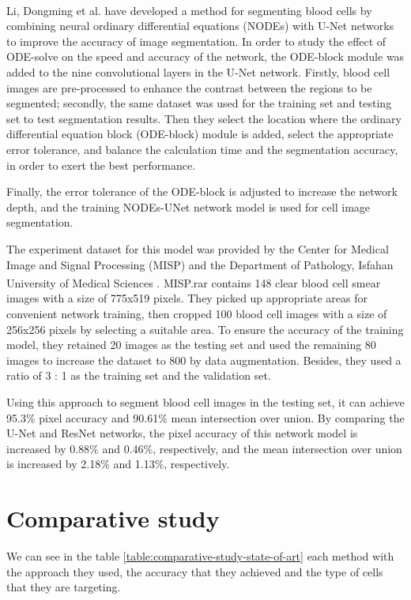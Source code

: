 {Li, Dongming et al. \textsuperscript{\cite{li2021robust}} have developed a method for segmenting blood cells by combining neural ordinary differential equations (NODEs) with U-Net networks to improve the accuracy of image segmentation. In order to study the effect of ODE-solve on the speed and accuracy of the network, the ODE-block module was added to the nine convolutional layers in the U-Net network. Firstly, blood cell images are pre-processed to enhance the contrast between the regions to be segmented; secondly, the same dataset was used for the training set and testing set to test segmentation results. Then they select the location where the ordinary differential equation block (ODE-block) module is added, select the appropriate error tolerance, and balance the calculation time and the segmentation accuracy, in order to exert the best performance.\

Finally, the error tolerance of the ODE-block is adjusted to increase the network depth, and the training NODEs-UNet network model is used for cell image segmentation. 

The experiment dataset for this model was provided by the Center for Medical Image and Signal Processing (MISP) and the Department of Pathology, Isfahan University of Medical Sciences \textsuperscript{\cite{sarrafzadeh2014selection}}. MISP.rar contains 148 clear blood cell smear images with a size of 775x519 pixels. They picked up appropriate areas for convenient network training, then cropped 100 blood cell images with a size of 256x256 pixels by selecting a suitable area. To ensure the accuracy of the training model, they retained 20 images as the testing set and used the remaining 80 images to increase the dataset to 800 by data augmentation. Besides, they used a ratio of 3 : 1 as the training set and the validation set.

Using this approach to segment blood cell images in the testing set, it can achieve 95.3\% pixel accuracy and 90.61\% mean intersection over union. By comparing the U-Net and ResNet networks, the pixel accuracy of this network model is increased by 0.88\% and 0.46\%, respectively, and the mean intersection over union is increased by 2.18\% and 1.13\%, respectively.

\section{Comparative study}



We can see in the table \ref{table:comparative-study-state-of-art} each method with the approach they used, the accuracy that they achieved and the type of cells that they are  targeting.

}
